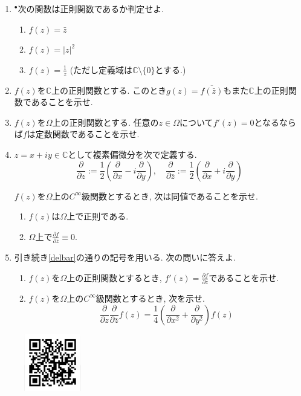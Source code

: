 \documentclass[dvipdfmx,a4paper,11pt]{article}
\newcommand{\C}{\mathbb{C}}
\theoremstyle{definition}
\newcommand{\pdrv}[2]{\frac{\partial #1}{\partial #2}}
\begin{document}
\begin{enumerate}[label=\textbf{問}1.\arabic*]
  
 \item $^{\bullet}$次の関数は正則関数であるか判定せよ.
 \begin{enumerate}
\setlength{\parskip}{0cm} 
  \setlength{\itemsep}{0cm} 
  \item $f(z) = \bar{z}$
   \item $f(z) = |z|^2$
    \item $f(z) = \frac{1}{z}$ (ただし定義域は$\C \setminus \{ 0\}$とする.)
 \end{enumerate}
 
 \item $f(z)$を$\C$上の正則関数とする. このとき$g(z) = \overline{f(\bar{z})}$もまた$\C$上の正則関数であることを示せ. 

\item $f(z)$を$\Omega$上の正則関数とする. 任意の$z \in \Omega$について$f'(z)=0$となるならば$f$は定数関数であることを示せ.



\item \label{delbar}$z = x + iy \in \C$として複素偏微分を次で定義する.
$$
\pdrv{}{z} := \frac{1}{2} \left(\pdrv{}{x}  - i \pdrv{}{y} \right), \quad
\pdrv{}{\bar{z}} := \frac{1}{2} \left(\pdrv{}{x}  + i \pdrv{}{y}\right)
$$

$f(z)$を$\Omega $上の$C^{\infty}$級関数とするとき, 次は同値であることを示せ.
\begin{enumerate}
    \setlength{\parskip}{0cm} 
  \setlength{\itemsep}{0cm} 
  \item $f(z)$は$\Omega$上で正則である.
  \item $\Omega$上で$\pdrv{f}{\bar{z}}  \equiv 0$.
\end{enumerate}

\item 引き続き\ref{delbar}の通りの記号を用いる. 次の問いに答えよ. 
 \begin{enumerate}
\setlength{\parskip}{0cm} 
  \setlength{\itemsep}{0cm} 
\item  $f(z)$を$\Omega$上の正則関数とするとき, $f'(z)=\pdrv{f}{z}$であることを示せ.
\item $f(z)$を$\Omega$上の$C^{\infty}$級関数とするとき, 次を示せ.
$$\pdrv{}{z}\pdrv{}{\bar{z}} f(z) = \frac{1}{4}\left(\pdrv{}{x^2} + \pdrv{}{y^2} \right) f(z)$$
 \end{enumerate}
 

 \end{enumerate}

 
 \vspace{11pt}\begin{figure}  \centering\includegraphics[height=25mm, width=25mm]{complex.png}\end{figure}
\end{document}
